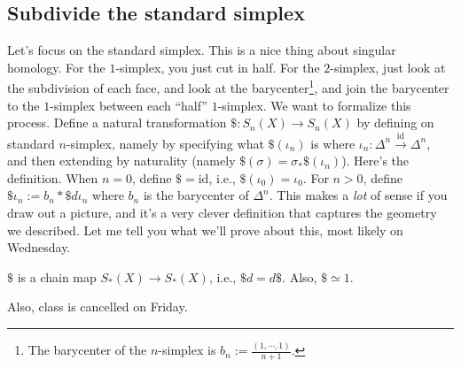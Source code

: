 \subsection{Subdivide the standard simplex}
Let's focus on the standard simplex. This is a nice thing about singular homology. For the $1$-simplex, you just cut in half. For the $2$-simplex, just look at the subdivision of each face, and look at the barycenter\footnote{The barycenter of the $n$-simplex is $b_n:=\frac{(1,\cdots,1)}{n+1}$.}, and join the barycenter to the $1$-simplex between each ``half'' $1$-simplex. We want to formalize this process. Define a natural transformation $\$:S_n(X)\to S_n(X)$ by defining on standard $n$-simplex, namely by specifying what $\$(\iota_n)$ is where $\iota_n:\Delta^n\xrightarrow{\mathrm{id}}\Delta^n$, and then extending by naturality (namely $\$(\sigma)=\sigma_\ast\$(\iota_n)$). Here's the definition. When $n=0$, define $\$=\mathrm{id}$, i.e., $\$(\iota_0)=\iota_0$. For $n>0$, define $\$\iota_n:=b_n\ast\$ d\iota_n$ where $b_n$ is the barycenter of $\Delta^n$. This makes a \emph{lot} of sense if you draw out a picture, and it's a very clever definition that captures the geometry we described. Let me tell you what we'll prove about this, most likely on Wednesday.
\begin{prop}
$\$$ is a chain map $S_\ast(X)\to S_\ast(X)$, i.e., $\$d=d\$$. Also, $\$\simeq 1$.
\end{prop}
Also, class is cancelled on Friday.
